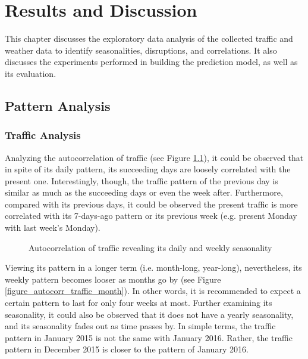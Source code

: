 \chapter{Results and Discussion}

This chapter discusses the exploratory data analysis of the collected traffic and weather data to identify seasonalities, disruptions, and correlations. It also discusses the experiments performed in building the prediction model, as well as its evaluation.

\section{Pattern Analysis}
\subsection{Traffic Analysis}

Analyzing the autocorrelation of traffic (see Figure \ref{figure_autocorr_week}), it could be observed that in spite of its daily pattern, its succeeding days are loosely correlated with the present one. Interestingly, though, the traffic pattern of the previous day is similar as much as the succeeding days or even the week after. Furthermore, compared with its previous days, it could be observed the present traffic is more correlated with its 7-days-ago pattern or its previous week (e.g. present Monday with last week's Monday).


\begin{figure}
  \centering
  \captionsetup{justification=centering}
  \caption{Autocorrelation of traffic revealing its daily and weekly seasonality}
  \label{figure_autocorr_week}
\end{figure}


\label{figure_autocorr_week}

Viewing its pattern in a longer term (i.e. month-long, year-long), nevertheless, its weekly pattern becomes looser as months go by (see Figure \ref{figure_autocorr_traffic_month}). In other words, it is recommended to expect a certain pattern to last for only four weeks at most. Further examining its seasonality, it could also be observed that it does not have a yearly seasonality, and its seasonality fades out as time passes by. In simple terms, the traffic pattern in January 2015 is not the same with January 2016. Rather, the traffic pattern in December 2015 is closer to the pattern of January 2016.



